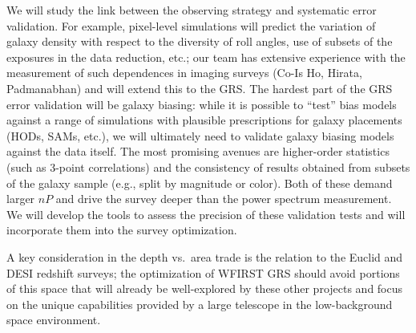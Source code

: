 We will study the link between the observing strategy and systematic error
validation.  For example, pixel-level simulations will predict the variation of
galaxy density with respect to the diversity of roll angles, use of subsets of
the exposures in the data reduction, etc.; our team has extensive experience
with the measurement of such dependences in imaging surveys (Co-Is Ho, Hirata,
Padmanabhan)
and will extend this to the GRS. The hardest part of the GRS error
validation will be galaxy biasing: while it is possible to ``test'' bias models
against a range of simulations with plausible prescriptions for galaxy
placements (HODs, SAMs, etc.), we will ultimately need to validate galaxy
biasing models against the data itself. The most promising avenues are
higher-order statistics (such as 3-point correlations)
and the consistency of results obtained from subsets of the galaxy sample
(e.g., split by magnitude or color).
Both of these demand larger $nP$ and drive
the survey deeper than the power spectrum measurement.
We will develop the tools to assess the precision of these
validation tests and will incorporate them into the survey optimization.

A key consideration in the depth vs.\ area trade is the relation to the Euclid
and DESI redshift surveys; the optimization of WFIRST GRS should avoid portions
of this space that will already be well-explored by these other projects and
focus on the unique capabilities provided by a large telescope in the
low-background space environment.

